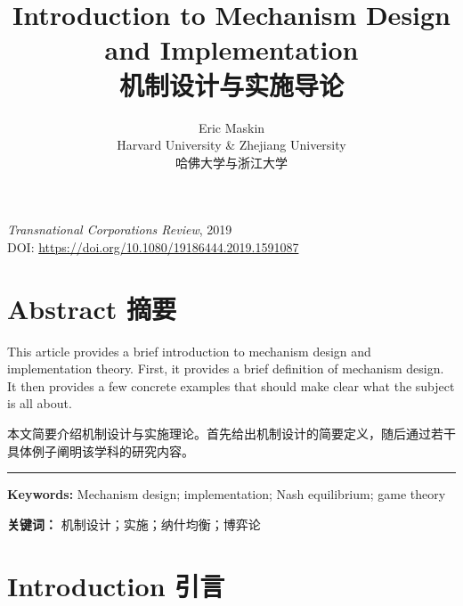 \documentclass[12pt,a4paper]{article}
\title{\textbf{Introduction to Mechanism Design and Implementation\\[4pt]
\large 机制设计与实施导论}}
\author{Eric Maskin\\[3pt]
{\small Harvard University \& Zhejiang University}\\[3pt]
{\small 哈佛大学与浙江大学}}
\date{}
\newenvironment{original}{%
  \par\vspace{4pt}\noindent%
  \color{black}%
  \ignorespaces
}{%
  \par\vspace{2pt}%
}
\newenvironment{translation}{%
  \par\vspace{2pt}\noindent%
  \color{transblue}%
  \ignorespaces
}{%
  \par\vspace{4pt}\hrule\vspace{6pt}%
}
\begin{document}
\maketitle

\vspace{-1cm}
\begin{center}
\textit{Transnational Corporations Review}, 2019\\
DOI: \url{https://doi.org/10.1080/19186444.2019.1591087}
\end{center}

\section*{Abstract \hfill 摘要}

\begin{original}
This article provides a brief introduction to mechanism design and implementation theory. First, it provides a brief definition of mechanism design. It then provides a few concrete examples that should make clear what the subject is all about.
\end{original}
\begin{translation}
本文简要介绍机制设计与实施理论。首先给出机制设计的简要定义，随后通过若干具体例子阐明该学科的研究内容。
\end{translation}

\medskip
\noindent\textbf{Keywords:} Mechanism design; implementation; Nash equilibrium; game theory

\noindent\textbf{关键词：} 机制设计；实施；纳什均衡；博弈论

\newpage

\section{Introduction \hfill 引言}
\end{document}
